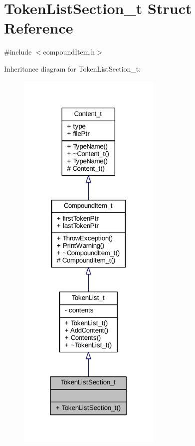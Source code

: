 \hypertarget{struct_token_list_section__t}{}\section{Token\+List\+Section\+\_\+t Struct Reference}
\label{struct_token_list_section__t}


{\ttfamily \#include $<$compound\+Item.\+h$>$}



Inheritance diagram for Token\+List\+Section\+\_\+t\+:
\nopagebreak
\begin{figure}[H]
\begin{center}
\leavevmode
\includegraphics[width=194pt]{struct_token_list_section__t__inherit__graph}
\end{center}
\end{figure}


